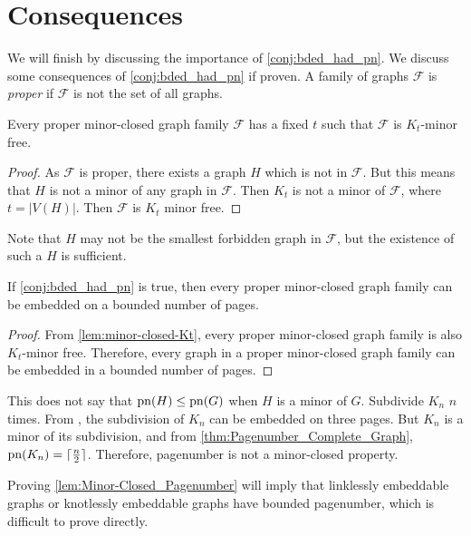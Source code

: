 \section{Consequences}
We will finish by discussing the importance of \cref{conj:bded_had_pn}. We discuss some consequences of \cref{conj:bded_had_pn} if proven. 
A family of graphs $\mathcal{F}$ is \textit{proper} if $\mathcal{F}$ is not the set of all graphs. 

\begin{lemma}\label{lem:minor-closed-Kt}
    Every proper minor-closed graph family $\mathcal{F}$ has a fixed $t$ such that $\mathcal{F}$ is $K_t$-minor free. 
\end{lemma}

\begin{proof}
    As $\mathcal{F}$ is proper, there exists a graph $H$ which is not in $\mathcal{F}$. But this means that $H$ is not a minor of any graph in $\mathcal{F}$. Then $K_t$ is not a minor of $\mathcal{F}$, where $t = |V(H)|$. Then $\mathcal{F}$ is $K_t$ minor free. 
\end{proof}
Note that $H$ may not be the smallest forbidden graph in $\mathcal{F}$, but the existence of such a $H$ is sufficient. 
\begin{lemma}\label{lem:Minor-Closed_Pagenumber}
    If \cref{conj:bded_had_pn} is true, then every proper minor-closed graph family can be embedded on a bounded number of pages.
\end{lemma}
\begin{proof}
    From \cref{lem:minor-closed-Kt}, every proper minor-closed graph family is also $K_t$-minor free. Therefore, every graph in a proper minor-closed graph family can be embedded in a bounded number of pages.
\end{proof}

This does not say that $\operatorname{pn}(H) \leq \operatorname{pn}(G)$ when $H$ is a minor of $G$. Subdivide $K_n$ $n$ times. From \textcite{atneosenEmbeddabilityCompactaNbooks}, the subdivision of $K_n$ can be embedded on three pages. But $K_n$ is a minor of its subdivision, and from \cref{thm:Pagenumber_Complete_Graph}, $\operatorname{pn}(K_n) = \lceil \frac{n}{2} \rceil$. Therefore, pagenumber is not a minor-closed property. 

Proving \cref{lem:Minor-Closed_Pagenumber} will imply that linklessly embeddable graphs or knotlessly embeddable graphs have bounded pagenumber, which is difficult to prove directly. 
